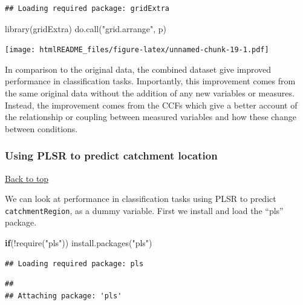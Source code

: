 \documentclass[
]{article}
\newenvironment{Shaded}{\begin{snugshade}}{\end{snugshade}}
\newcommand{\ControlFlowTok}[1]{\textcolor[rgb]{0.13,0.29,0.53}{\textbf{#1}}}
\newcommand{\FunctionTok}[1]{\textcolor[rgb]{0.00,0.00,0.00}{#1}}
\newcommand{\NormalTok}[1]{#1}
\newcommand{\SpecialCharTok}[1]{\textcolor[rgb]{0.00,0.00,0.00}{#1}}
\newcommand{\StringTok}[1]{\textcolor[rgb]{0.31,0.60,0.02}{#1}}
\begin{document}
\begin{verbatim}
## Loading required package: gridExtra
\end{verbatim}

\begin{Shaded}
\begin{Highlighting}[]
\FunctionTok{library}\NormalTok{(gridExtra)}
\FunctionTok{do.call}\NormalTok{(}\StringTok{"grid.arrange"}\NormalTok{, p)}
\end{Highlighting}
\end{Shaded}

\texttt{[image: htmlREADME\_files/figure-latex/unnamed-chunk-19-1.pdf]}

In comparison to the original data, the combined dataset give improved
performance in classification tasks. Importantly, this improvement comes
from the same original data without the addition of any new variables or
measures. Instead, the improvement comes from the CCFs which give a
better account of the relationship or coupling between measured
variables and how these change between conditions.

\hypertarget{using-plsr-to-predict-catchment-location}{%
\subsubsection{\texorpdfstring{\textbf{Using PLSR to predict catchment
location}}{Using PLSR to predict catchment location}}\label{using-plsr-to-predict-catchment-location}}

\protect\hyperlink{}{Back to top}

We can look at performance in classification tasks using PLSR to predict
\texttt{catchmentRegion}, as a dummy variable. First we install and load
the ``pls'' package.

\begin{Shaded}
\begin{Highlighting}[]
\ControlFlowTok{if}\NormalTok{(}\SpecialCharTok{!}\FunctionTok{require}\NormalTok{(}\StringTok{"pls"}\NormalTok{)) }\FunctionTok{install.packages}\NormalTok{(}\StringTok{"pls"}\NormalTok{)}
\end{Highlighting}
\end{Shaded}

\begin{verbatim}
## Loading required package: pls
\end{verbatim}

\begin{verbatim}
## 
## Attaching package: 'pls'
\end{verbatim}
\end{document}
